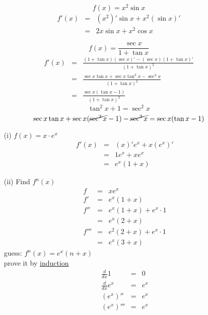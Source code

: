 \begin{eg}
$$\displaystyle f(x) = x^2 \sin x$$
$$\begin{array}{rcl}
\displaystyle f'(x) & = & \displaystyle (x^2)' \sin x  + x^2 (\sin x)'\\
& = & \displaystyle 2x \sin x+ x^2 \cos x
\end{array}$$
\end{eg}
\begin{eg}
$$\displaystyle f(x) = \frac{\sec x}{1 + \tan x}$$
$$\begin{array}{rcl}
\displaystyle f'(x) & = & \displaystyle \frac{(1+\tan x)(\sec x)' - (\sec x)(1 + \tan x)'}{(1 + \tan x)^2}\\
& = & \displaystyle \frac{\sec x \tan x + \sec x \tan ^2 x - \sec ^3 x}{(1+\tan x)^2}\\
& = & \displaystyle \frac{\sec x (\tan x-1)}{(1+ \tan x)^2}
\end{array}$$
$$\tan ^2 x  +1 = \sec ^2 x$$
$$\sec x \tan x + \sec x (\cancel{\sec^2 x} -1) - \cancel{\sec ^3x} = \sec x(\tan x-1)$$
\end{eg}
\begin{eg}
\begin{itemize}
\item[(i)]  $f(x) = x\cdot e^x$
$$\begin{array}{rcl}
f'(x) & = & \displaystyle (x)'e^x + x(e^x)'\\
& = &\displaystyle 1 e^x + x e^x\\
& = &\displaystyle e^x(1+x)
\end{array}$$
\item[(ii)] Find $f^n(x)$\\
$$\begin{array}{rcl}
f & = & xe^x\\
f' & = & e^x(1+x)\\
f'' & = & e^x(1+x) + e^x \cdot 1\\
& = & e^x(2+x)\\
f''' & = & e^2(2+x) + e^x \cdot 1\\
& = & e^x(3+x)
\end{array}$$
guess: $f^n(x) = e^x(n +x)$\\
prove it by \underline{induction}\\
$$\begin{array}{ccl}
\displaystyle \frac{d}{dx} 1 & = &0\\
\displaystyle \frac{d}{dx} e^x & = &e^x\\
\displaystyle (e^x)'' & = &e^x\\
\displaystyle (e^x)''' & = & e^x
\end{array}$$
\end{itemize}
\end{eg}
